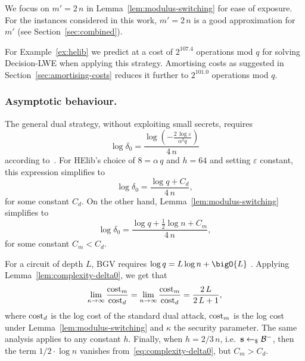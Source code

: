 \documentclass[a4paper]{llncs}
\begin{document}
\begin{remark}
We focus on $m' = 2\,n$ in Lemma~\ref{lem:modulus-switching} for ease of exposure. For the instances considered in this work, $m' = 2\,n$ is a good approximation for $m'$ (see Section~\ref{sec:combined}).
\end{remark}

For Example~\ref{ex:helib} we predict at a cost of \(2^{107.4}\) operations mod \(q\) for solving Decision-LWE when applying this strategy. Amortising costs as suggested in Section~\ref{sec:amortising-costs} reduces it further to \(2^{{101.0}}\) operations mod \(q\).

\subsubsection{Asymptotic behaviour.} The general dual strategy, without exploiting small secrets, requires\[\log δ_0 = \frac{\log\left(-\frac{2 \, \log ε}{\alpha^{2} q}\right)}{4 \, n}\] according to~\cite{JMC:AlbPlaSco15}. For HElib's choice of $8 = α\,q$ and $h=64$ and setting \(ε\) constant, this expression simplifies to \[\log δ_0 = \frac{\log q  + C_{d}}{4\,n},\] for some constant \(C_{d}\). On the other hand, Lemma~\ref{lem:modulus-switching} simplifies to
\begin{equation}
  \label{eq:complexity-delta0}
  \log δ_0 = \frac{\log q  + \frac{1}{2}\log n + C_{m}}{4\,n},  
\end{equation}
for some constant \(C_{m} < C_{d}\).

For a circuit of depth \(L\), BGV requires \(\log q =  L \log n + \bigO{L}\) \cite[Appendix~C.2]{EPRINT:GenHalSma12}. Applying Lemma~\ref{lem:complexity-delta0}, we get that \[\lim_{\kappa \rightarrow \infty} \frac{\textnormal{cost}_{m}}{\textnormal{cost}_{d}} = \lim_{n \rightarrow \infty} \frac{\textnormal{cost}_{m}}{\textnormal{cost}_{d}} = \frac{2\,L}{2\,L +1} ,\] where \(\textnormal{cost}_{d}\) is the log cost of the standard dual attack, \(\textnormal{cost}_{m}\) is the log cost under Lemma~\ref{lem:modulus-switching} and \(\kappa\) the security parameter. The same analysis applies to any constant \(h\). Finally, when \(h=2/3\,n\), i.e.~\(\s \sample \B{-}\), then the term \(1/2\cdot \log n\) vanishes from~\eqref{eq:complexity-delta0}, but \(C_{m}>C_{d}\).

\begin{comment}
  sage: f1 = symbolic_modulus_switching(n, 8/q, q, h=64, m=2*n, epsilon=1/2)
  sage: f1.canonicalize_radical()
  sage: f2 = symbolic_sis(n, 8/q, q, m=2*n, epsilon=1/2)
  sage: f2.canonicalize_radical()
\end{comment}
\end{document}
